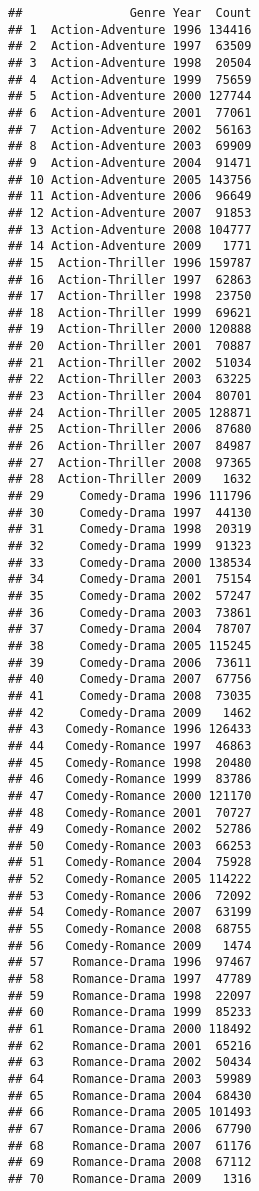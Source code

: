 \documentclass[
]{article}
\begin{document}
\begin{verbatim}
##               Genre Year  Count
## 1  Action-Adventure 1996 134416
## 2  Action-Adventure 1997  63509
## 3  Action-Adventure 1998  20504
## 4  Action-Adventure 1999  75659
## 5  Action-Adventure 2000 127744
## 6  Action-Adventure 2001  77061
## 7  Action-Adventure 2002  56163
## 8  Action-Adventure 2003  69909
## 9  Action-Adventure 2004  91471
## 10 Action-Adventure 2005 143756
## 11 Action-Adventure 2006  96649
## 12 Action-Adventure 2007  91853
## 13 Action-Adventure 2008 104777
## 14 Action-Adventure 2009   1771
## 15  Action-Thriller 1996 159787
## 16  Action-Thriller 1997  62863
## 17  Action-Thriller 1998  23750
## 18  Action-Thriller 1999  69621
## 19  Action-Thriller 2000 120888
## 20  Action-Thriller 2001  70887
## 21  Action-Thriller 2002  51034
## 22  Action-Thriller 2003  63225
## 23  Action-Thriller 2004  80701
## 24  Action-Thriller 2005 128871
## 25  Action-Thriller 2006  87680
## 26  Action-Thriller 2007  84987
## 27  Action-Thriller 2008  97365
## 28  Action-Thriller 2009   1632
## 29     Comedy-Drama 1996 111796
## 30     Comedy-Drama 1997  44130
## 31     Comedy-Drama 1998  20319
## 32     Comedy-Drama 1999  91323
## 33     Comedy-Drama 2000 138534
## 34     Comedy-Drama 2001  75154
## 35     Comedy-Drama 2002  57247
## 36     Comedy-Drama 2003  73861
## 37     Comedy-Drama 2004  78707
## 38     Comedy-Drama 2005 115245
## 39     Comedy-Drama 2006  73611
## 40     Comedy-Drama 2007  67756
## 41     Comedy-Drama 2008  73035
## 42     Comedy-Drama 2009   1462
## 43   Comedy-Romance 1996 126433
## 44   Comedy-Romance 1997  46863
## 45   Comedy-Romance 1998  20480
## 46   Comedy-Romance 1999  83786
## 47   Comedy-Romance 2000 121170
## 48   Comedy-Romance 2001  70727
## 49   Comedy-Romance 2002  52786
## 50   Comedy-Romance 2003  66253
## 51   Comedy-Romance 2004  75928
## 52   Comedy-Romance 2005 114222
## 53   Comedy-Romance 2006  72092
## 54   Comedy-Romance 2007  63199
## 55   Comedy-Romance 2008  68755
## 56   Comedy-Romance 2009   1474
## 57    Romance-Drama 1996  97467
## 58    Romance-Drama 1997  47789
## 59    Romance-Drama 1998  22097
## 60    Romance-Drama 1999  85233
## 61    Romance-Drama 2000 118492
## 62    Romance-Drama 2001  65216
## 63    Romance-Drama 2002  50434
## 64    Romance-Drama 2003  59989
## 65    Romance-Drama 2004  68430
## 66    Romance-Drama 2005 101493
## 67    Romance-Drama 2006  67790
## 68    Romance-Drama 2007  61176
## 69    Romance-Drama 2008  67112
## 70    Romance-Drama 2009   1316
\end{verbatim}
\end{document}
